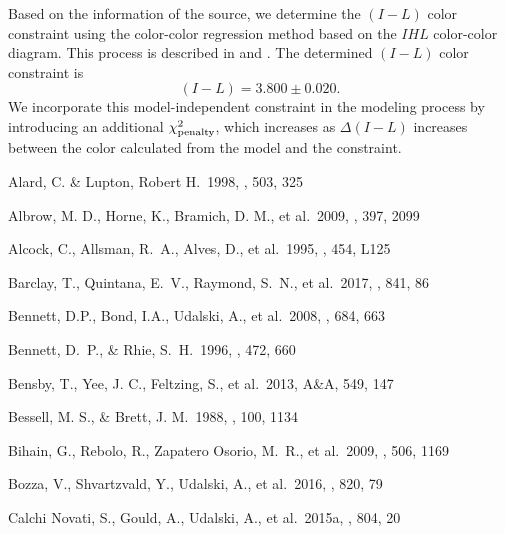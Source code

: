 \documentclass[10pt]{emulateapj}
\begin{document}
Based on the information of the source, we determine the $(I-L)$ color constraint using the color-color 
regression method based on the $IHL$ color-color diagram. This process is described in \citet{calchi15b} 
and \citet{shin17}. The determined $(I-L)$ color constraint is 
\begin{equation}
(I-L)=3.800 \pm 0.020.
\end{equation}
We incorporate this model-independent constraint in the modeling process by introducing an additional 
$\chi^2_{\rm penalty}$, which increases as $\Delta (I-L)$ increases between the color calculated from 
the model and the constraint.


\begin{thebibliography}{999}

Alard, C. \& Lupton, Robert H.\ 1998, \apj, 503, 325

Albrow, M. D., Horne, K., Bramich, D. M., et al.\ 2009, \mnras, 397, 2099

Alcock, C., Allsman, R.~A., Alves, D., et al.\ 1995, \apjl, 454, L125 

Barclay, T., Quintana, E.~V., Raymond, S.~N., et al.\ 2017, \apj, 841, 86 

Bennett, D.P., Bond, I.A., Udalski, A., et al.\ 2008, \apj, 684, 663

Bennett, D.~P., \& Rhie, S.~H.\ 1996, \apj, 472, 660 

Bensby, T., Yee, J. C., Feltzing, S., et al.\ 2013, A\&A, 549, 147

Bessell, M. S., \& Brett, J. M.\ 1988, \pasp, 100, 1134

Bihain, G., Rebolo, R., Zapatero Osorio, M.~R., et al.\ 2009, \aap, 506, 1169 

Bozza, V., Shvartzvald, Y., Udalski, A., et al.\ 2016, \apj, 820, 79 

Calchi Novati, S., Gould, A., Udalski, A., et al.\ 2015a, \apj, 804, 20


\end{thebibliography}
\end{document}
